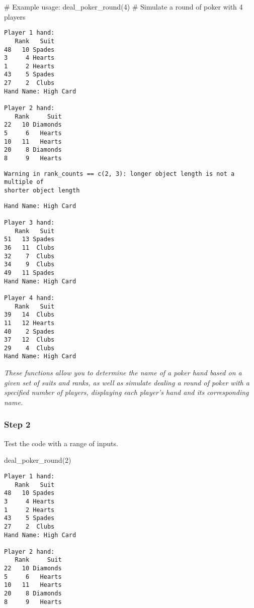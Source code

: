 \documentclass[
  letterpaper,
  DIV=11,
  numbers=noendperiod]{scrartcl}
\newenvironment{Shaded}{\begin{snugshade}}{\end{snugshade}}
\newcommand{\CommentTok}[1]{\textcolor[rgb]{0.37,0.37,0.37}{#1}}
\newcommand{\DecValTok}[1]{\textcolor[rgb]{0.68,0.00,0.00}{#1}}
\newcommand{\FunctionTok}[1]{\textcolor[rgb]{0.28,0.35,0.67}{#1}}
\newcommand{\NormalTok}[1]{\textcolor[rgb]{0.00,0.23,0.31}{#1}}
\begin{document}
\begin{Shaded}
\begin{Highlighting}[]
\CommentTok{\# Example usage:}
\FunctionTok{deal\_poker\_round}\NormalTok{(}\DecValTok{4}\NormalTok{)  }\CommentTok{\# Simulate a round of poker with 4 players}
\end{Highlighting}
\end{Shaded}

\begin{verbatim}
Player 1 hand: 
   Rank   Suit
48   10 Spades
3     4 Hearts
1     2 Hearts
43    5 Spades
27    2  Clubs
Hand Name: High Card 

Player 2 hand: 
   Rank     Suit
22   10 Diamonds
5     6   Hearts
10   11   Hearts
20    8 Diamonds
8     9   Hearts
\end{verbatim}

\begin{verbatim}
Warning in rank_counts == c(2, 3): longer object length is not a multiple of
shorter object length
\end{verbatim}

\begin{verbatim}
Hand Name: High Card 

Player 3 hand: 
   Rank   Suit
51   13 Spades
36   11  Clubs
32    7  Clubs
34    9  Clubs
49   11 Spades
Hand Name: High Card 

Player 4 hand: 
   Rank   Suit
39   14  Clubs
11   12 Hearts
40    2 Spades
37   12  Clubs
29    4  Clubs
Hand Name: High Card 
\end{verbatim}

\emph{These functions allow you to determine the name of a poker hand
based on a given set of suits and ranks, as well as simulate dealing a
round of poker with a specified number of players, displaying each
player's hand and its corresponding name.}

\hypertarget{step-2-2}{%
\subsubsection{Step 2}\label{step-2-2}}

Test the code with a range of inputs.

\begin{Shaded}
\begin{Highlighting}[]
\FunctionTok{deal\_poker\_round}\NormalTok{(}\DecValTok{2}\NormalTok{)}
\end{Highlighting}
\end{Shaded}

\begin{verbatim}
Player 1 hand: 
   Rank   Suit
48   10 Spades
3     4 Hearts
1     2 Hearts
43    5 Spades
27    2  Clubs
Hand Name: High Card 

Player 2 hand: 
   Rank     Suit
22   10 Diamonds
5     6   Hearts
10   11   Hearts
20    8 Diamonds
8     9   Hearts
\end{verbatim}
\end{document}
